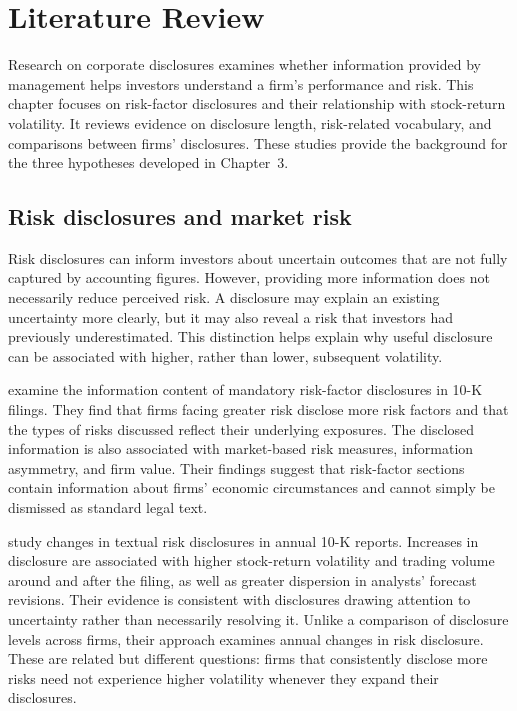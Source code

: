 \chapter{Literature Review}
\label{ch:literature}

Research on corporate disclosures examines whether information provided by
management helps investors understand a firm's performance and risk. This
chapter focuses on risk-factor disclosures and their relationship with
stock-return volatility. It reviews evidence on disclosure length,
risk-related vocabulary, and comparisons between firms' disclosures. These
studies provide the background for the three hypotheses developed in
Chapter~3.

\section{Risk disclosures and market risk}

Risk disclosures can inform investors about uncertain outcomes that are not
fully captured by accounting figures. However, providing more information does
not necessarily reduce perceived risk. A disclosure may explain an existing
uncertainty more clearly, but it may also reveal a risk that investors had
previously underestimated. This distinction helps explain why useful
disclosure can be associated with higher, rather than lower, subsequent
volatility.

\textcite{campbell2014} examine the information content of mandatory
risk-factor disclosures in 10-K filings. They find that firms facing greater
risk disclose more risk factors and that the types of risks discussed reflect
their underlying exposures. The disclosed information is also associated with
market-based risk measures, information asymmetry, and firm value. Their
findings suggest that risk-factor sections contain information about firms'
economic circumstances and cannot simply be dismissed as standard legal text.

\textcite{kravet2013} study changes in textual risk disclosures in annual 10-K
reports. Increases in disclosure are associated with higher stock-return
volatility and trading volume around and after the filing, as well as greater
dispersion in analysts' forecast revisions. Their evidence is consistent with
disclosures drawing attention to uncertainty rather than necessarily resolving
it. Unlike a comparison of disclosure levels across firms, their approach
examines annual changes in risk disclosure. These are related but different
questions: firms that consistently disclose more risks need not experience
higher volatility whenever they expand their disclosures.

